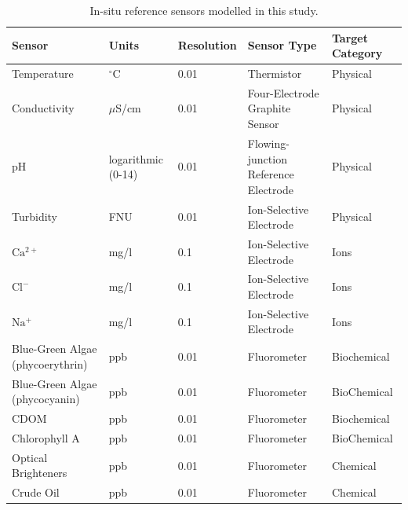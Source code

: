 \documentclass[sensors,article,submit,pdftex,moreauthors]{Definitions/mdpi}
\begin{document}
\begin{table}[H] 
\caption{In-situ reference sensors modelled in this study.\label{tab:sensors}}
\begin{tabularx}{\textwidth}{CCCCC}
\toprule
\textbf{Sensor}	& \textbf{Units} & Resolution & \textbf{Sensor Type} & \textbf{Target Category}\\
\midrule
Temperature		                    & $^{\circ}$C        & 0.01  & Thermistor                           & Physical \\
Conductivity                        & $\mu$S/cm          & 0.01  & Four-Electrode Graphite Sensor       & Physical  \\
pH                                  & logarithmic (0-14) & 0.01  & Flowing-junction Reference Electrode & Physical \\
Turbidity                           & FNU                & 0.01  & Ion-Selective Electrode              & Physical \\
$\mathrm{Ca^{2+}}$                  & mg/l               & 0.1   & Ion-Selective Electrode              & Ions \\
$\mathrm{Cl^-}$                     & mg/l               & 0.1   & Ion-Selective Electrode              & Ions \\
$\mathrm{Na^+}$                     & mg/l               & 0.1   & Ion-Selective Electrode              & Ions \\
Blue-Green Algae (phycoerythrin)    & ppb                & 0.01  & Fluorometer                          & Biochemical \\
Blue-Green Algae (phycocyanin)      & ppb                & 0.01  & Fluorometer                          & BioChemical \\
CDOM                                & ppb                & 0.01  & Fluorometer                          & Biochemical \\
Chlorophyll A                       & ppb                & 0.01  & Fluorometer                          & BioChemical \\
Optical Brighteners                 & ppb                & 0.01  & Fluorometer                          & Chemical \\
Crude Oil                           & ppb                & 0.01  & Fluorometer                          & Chemical\\
\bottomrule
\end{tabularx}
\end{table}
\end{document}
